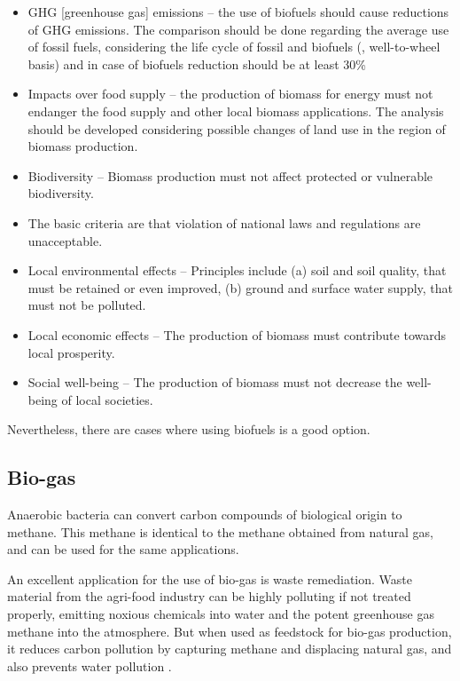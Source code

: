 {\itshape
\begin{itemize}
  \item GHG [greenhouse gas] emissions – the use of biofuels should cause reductions of GHG emissions. The
comparison should be done regarding the average use of fossil fuels, considering the life
cycle of fossil and biofuels (, well-to-wheel basis) and in case of biofuels reduction
should be at least 30\%
 \item Impacts over food supply – the production of biomass for energy must not endanger the
food supply and other local biomass applications. The analysis should be developed
considering possible changes of land use in the region of biomass production.
 \item Biodiversity – Biomass production must not affect protected or vulnerable biodiversity.
 \item The basic criteria are that violation of national laws and regulations are unacceptable.
 \item Local environmental effects – Principles include (a) soil and soil quality, that must be
retained or even improved, (b) ground and surface water supply, that must not be polluted.
 \item Local economic effects – The production of biomass must contribute towards local
prosperity.
 \item  Social well-being – The production of biomass must not decrease the well-being of local societies. 
\end{itemize}
}

Nevertheless, there are cases where using biofuels is a good option. 

\subsection{Bio-gas}

Anaerobic bacteria can convert carbon compounds of biological origin to methane.
This methane is identical to the methane obtained from natural gas, and can be
used for the same applications.

An excellent application for the use of bio-gas is waste remediation. Waste
material from the agri-food industry can be highly polluting if not treated
properly, emitting noxious chemicals into water and the potent greenhouse gas
methane into the atmosphere. But when used as feedstock for bio-gas production,
it reduces carbon pollution by capturing methane and displacing natural gas, and
also prevents water pollution \autocite{Venter2014}. 

